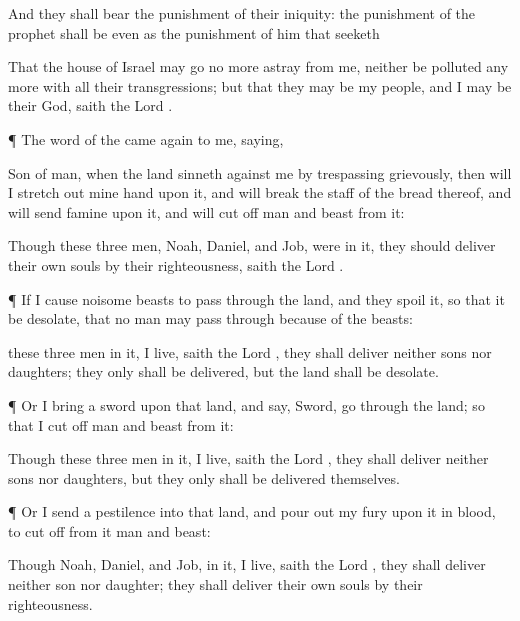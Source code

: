 {And they shall
bear the punishment of their
iniquity: the
punishment of the
prophet shall be even as the
punishment of him that
seeketh
{}

That the
house of
Israel may go no more
astray from
me, neither be
polluted any more with all their
transgressions; but that they may be my
people, and I may be their
God,
saith the
Lord
{}.


\par }{\PP {}¶ The
word of the
{} came again to me,
saying,

Son of
man, when the
land
sinneth against me by
trespassing
grievously, then will I stretch
out mine
hand upon it, and will
break the
staff of the
bread thereof, and will
send
famine upon it, and will cut
off
man and
beast from it:

Though these
three
men,
Noah,
Daniel, and
Job, were in
it, they should
deliver
{} their own
souls by their
righteousness,
saith the
Lord
{}.


\par }{\PP {}¶
If I cause
noisome
beasts to pass
through the
land, and they
spoil it, so that it be
desolate, that no man may pass
through
because of the
beasts:

 these
three
men
{} in
it,
{} I
live,
saith the
Lord
{}, they shall
deliver neither
sons nor
daughters; they only shall be
delivered, but the
land shall be
desolate.


\par }{\PP {}¶ Or
{} I
bring a
sword upon that
land, and
say,
Sword, go
through the
land; so that I cut
off
man and
beast from it:

Though these
three
men
{} in
it,
{} I
live,
saith the
Lord
{}, they shall
deliver neither
sons nor
daughters, but they only shall be
delivered themselves.


\par }{\PP {}¶ Or
{} I
send a
pestilence into that
land, and pour
out my
fury upon it in
blood, to cut
off from it
man and
beast:

Though
Noah,
Daniel, and
Job,
{} in
it,
{} I
live,
saith the
Lord
{}, they shall
deliver neither
son
nor
daughter; they shall
{}
deliver their own
souls by their
righteousness.

}
